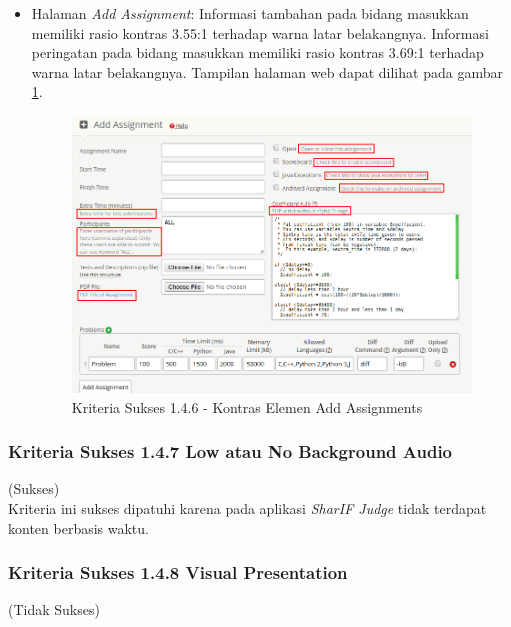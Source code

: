 \documentclass[a4paper,twoside]{article}
\begin{document}
\begin{enumerate}
\begin{itemize}
			\item Halaman \textit{Add Assignment}: Informasi tambahan pada bidang masukkan memiliki rasio kontras 3.55:1 terhadap warna latar belakangnya. Informasi peringatan pada bidang masukkan memiliki rasio kontras 3.69:1 terhadap warna latar belakangnya. Tampilan halaman web dapat dilihat pada gambar \ref{fig:kepatuhan_1_4_6_add_assignment}.
			\begin{figure}[H]
				\centering  
				\includegraphics[scale=0.5]{kepatuhan_1_4_6_add_assignment}  
				\caption[Kriteria Sukses 1.4.6 - Kontras Elemen Add Assignments]{Kriteria Sukses 1.4.6 - Kontras Elemen Add Assignments} 
				\label{fig:kepatuhan_1_4_6_add_assignment} 
			\end{figure}
			
		\end{itemize}
		
		\subsubsection*{Kriteria Sukses 1.4.7 Low atau No Background Audio}
		\label{subsubsec:kepatuhan_kriteria_1.4.7}
		(Sukses) \\
		
		Kriteria ini sukses dipatuhi karena pada aplikasi \textit{SharIF Judge} tidak terdapat konten berbasis waktu.
		
		
		\subsubsection*{Kriteria Sukses 1.4.8 Visual Presentation}
		\label{subsubsec:kepatuhan_kriteria_1.4.8}
		(Tidak Sukses) \\
		

\end{enumerate}
\end{document}
